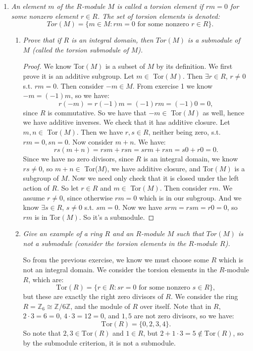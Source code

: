 \documentclass[12pt]{amsbook}
\theoremstyle{plain}
\numberwithin{section}{chapter}
\numberwithin{equation}{chapter}
\theoremstyle{definition}
\theoremstyle{remark}
\newcommand{\z}{\mathbb{Z}}
\begin{document}
\begin{enumerate}[label=\arabic*.]
\item \textit{An element $m$ of the $R$-module $M$ is called a torsion element if $rm = 0$ for some nonzero element $r \in R$. The set of torsion elements is denoted: } \label{ex10.1.8}
$$
Tor(M) = \{m \in M:rm = 0 \text{ for some nonzero } r \in R\}. 
$$

\begin{enumerate}
\item \textit{Prove that if $R$ is an integral domain, then $Tor(M)$ is a submodule of $M$ (called the torsion submodule of $M$). }
\begin{proof}
We know Tor$(M)$ is a subset of $M$ by its definition. We first prove it is an additive subgroup. Let $m \in $ Tor$(M)$. Then $\exists r \in R$, $r \neq 0$ s.t. $rm = 0$. Then consider $-m \in M$. From exercise 1 we know 
$
-m = (-1)m$, so we have:
$$
r(-m) = r(-1)m = (-1)rm = (-1)0 = 0,
$$
 since $R$ is commutative. So we have that $-m \in $ Tor$(M)$ as well, hence we have additive inverses. We check that it has additive closure. Let $m,n \in $ Tor$(M)$. Then we have $r,s \in R$, neither being zero, s.t. $rm = 0, sn = 0$. Now consider $m + n$. We have:
$$
rs(m + n) = rsm + rsn = srm + rsn = s0 + r0 = 0.
$$
Since we have no zero divisors, since $R$ is an integral domain, we know $rs \neq 0$, so $m  +n \in $ Tor($M$), we have additive closure, and Tor$(M)$ is a subgroup of $M$. Now we need only check that it is closed under the left action of $R$. So let $r \in R$ and $m \in $ Tor$(M)$. Then consider $rm$. We assume $r \neq 0$, since otherwise $rm = 0$ which is in our subgroup. And we know $\exists s \in R$, $s \neq 0$ s.t. $sm = 0$. Now we have $srm = rsm = r0 = 0$, so $rm$ is in Tor$(M)$. So it's a submodule. 
\end{proof}

\vspace{3mm}
\item \textit{Give an example of a ring $R$ and an $R$-module $M$ such that $Tor(M)$ is not a submodule (consider the torsion elements in the $R$-module $R$). }

So from the previous exercise, we know we must choose some $R$ which is not an integral domain. We consider the torsion elements in the $R$-module $R$, which are:
$$
\text{Tor}(R) = \{r \in R: sr = 0 \text{ for some nonzero }s \in R\},
$$
but these are exactly the right zero divisors of $R$. We consider the ring $R = \mathbb{Z}_6 \cong \z/6\z$, and the module of $R$ over itself. Note that in $R$, $2 \cdot 3 = 6 = 0$, $4\cdot 3 = 12 = 0$, and $1,5$ are not zero divisors, so we have:
$$
\text{Tor}(R) = \{0,2,3,4\}.
$$
So note that $2,3\in \text{Tor}(R)$ and $1 \in R$, but $2 + 1\cdot 3 = 5 \notin \text{Tor}(R)$, so by the submodule criterion, it is not a submodule. 


\end{enumerate}
\end{enumerate}
\end{document}
